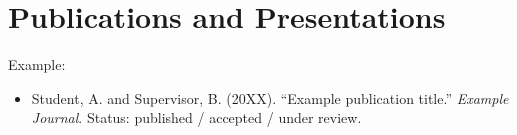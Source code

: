 \chapter*{Publications and Presentations}


Example:\begin{itemize}
  \item Student, A. and Supervisor, B. (20XX). ``Example publication title.''
  \emph{Example Journal}. Status: published / accepted / under review.
\end{itemize}


